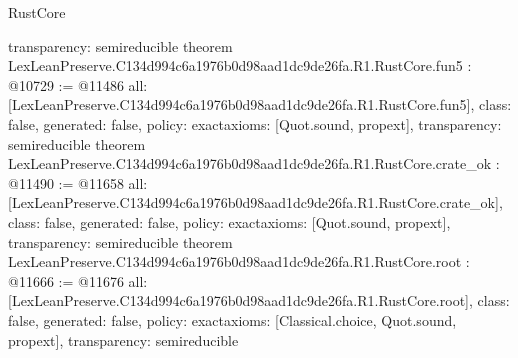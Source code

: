 \begin{lexlean}{RustCore}
\begin{coremodule}
{  transparency: semireducible
}
theorem LexLeanPreserve.C134d994c6a1976b0d98aad1dc9de26fa.R1.RustCore.fun5 : @10729 := @11486 {
  all: [LexLeanPreserve.C134d994c6a1976b0d98aad1dc9de26fa.R1.RustCore.fun5],
  class: false,
  generated: false,
  policy: exact{axioms: [Quot.sound, propext]},
  transparency: semireducible
}
theorem LexLeanPreserve.C134d994c6a1976b0d98aad1dc9de26fa.R1.RustCore.crate_ok : @11490 := @11658 {
  all: [LexLeanPreserve.C134d994c6a1976b0d98aad1dc9de26fa.R1.RustCore.crate_ok],
  class: false,
  generated: false,
  policy: exact{axioms: [Quot.sound, propext]},
  transparency: semireducible
}
theorem LexLeanPreserve.C134d994c6a1976b0d98aad1dc9de26fa.R1.RustCore.root : @11666 := @11676 {
  all: [LexLeanPreserve.C134d994c6a1976b0d98aad1dc9de26fa.R1.RustCore.root],
  class: false,
  generated: false,
  policy: exact{axioms: [Classical.choice, Quot.sound, propext]},
  transparency: semireducible
}


\end{coremodule}
\end{lexlean}
